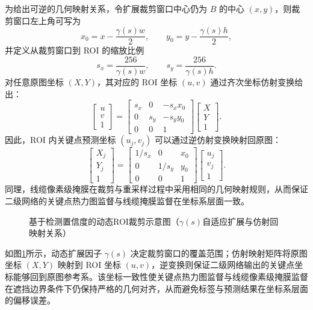 为给出可逆的几何映射关系，令扩展裁剪窗口中心仍为 \(B\) 的中心 \((x,y)\)，则裁剪窗口左上角可写为
$$
x_0=x-\frac{\gamma(s)w}{2},\qquad y_0=y-\frac{\gamma(s)h}{2},
$$
并定义从裁剪窗口到 ROI 的缩放比例
$$
s_x=\frac{256}{\gamma(s)w},\qquad s_y=\frac{256}{\gamma(s)h}.
$$
对任意原图坐标 \((X,Y)\)，其对应的 ROI 坐标 \((u,v)\) 通过齐次坐标仿射变换给出：
$$
\begin{bmatrix}u\\v\\1\end{bmatrix}
=
\begin{bmatrix}
s_x & 0 & -s_x x_0\\
0 & s_y & -s_y y_0\\
0 & 0 & 1
\end{bmatrix}
\begin{bmatrix}X\\Y\\1\end{bmatrix}.
$$
因此，ROI 内关键点预测坐标 \((u_j,v_j)\) 可以通过逆仿射变换映射回原图：
$$
\begin{bmatrix}X_j\\Y_j\\1\end{bmatrix}
=
\begin{bmatrix}
1/s_x & 0 & x_0\\
0 & 1/s_y & y_0\\
0 & 0 & 1
\end{bmatrix}
\begin{bmatrix}u_j\\v_j\\1\end{bmatrix}.
$$
同理，线缆像素级掩膜在裁剪与重采样过程中采用相同的几何映射规则，从而保证二级网络的关键点热力图监督与线缆掩膜监督在坐标系层面一致。

\begin{figure}[htbp]
  \centering
  \caption{基于检测置信度的动态ROI裁剪示意图（\(\gamma(s)\)自适应扩展与仿射回映射关系）}
  \label{fig:ch2:roi}
\end{figure}

如图\ref{fig:ch2:roi}所示，动态扩展因子 \(\gamma(s)\) 决定裁剪窗口的覆盖范围；仿射映射矩阵将原图坐标 \((X,Y)\) 映射到 ROI 坐标 \((u,v)\)，逆变换则保证二级网络输出的关键点坐标能够回到原图参考系。该坐标一致性使关键点热力图监督与线缆像素级掩膜监督在遮挡边界条件下仍保持严格的几何对齐，从而避免标签与预测结果在坐标系层面的偏移误差。

